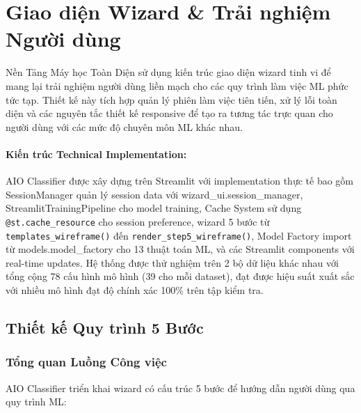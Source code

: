 \section{Giao diện Wizard \& Trải nghiệm Người dùng}\label{sec:wizard-interface}

\noindent
Nền Tảng Máy học Toàn Diện sử dụng kiến trúc giao diện wizard tinh vi để mang lại trải nghiệm người dùng liền mạch cho các quy trình làm việc ML phức tức tạp. Thiết kế này tích hợp quản lý phiên làm việc tiên tiến, xử lý lỗi toàn diện và các nguyên tắc thiết kế responsive để tạo ra tương tác trực quan cho người dùng với các mức độ chuyên môn ML khác nhau.

\paragraph{Kiến trúc Technical Implementation:}
AIO Classifier được xây dựng trên Streamlit với implementation thực tế bao gồm SessionManager quản lý session data với wizard\_ui.session\_manager, StreamlitTrainingPipeline cho model training, Cache System sử dụng \texttt{@st.cache\_resource} cho session preference, wizard 5 bước từ \texttt{templates\_wireframe()} đến \texttt{render\_step5\_wireframe()}, Model Factory import từ models.model\_factory cho 13 thuật toán ML, và các Streamlit components với real-time updates. Hệ thống được thử nghiệm trên 2 bộ dữ liệu khác nhau với tổng cộng 78 cấu hình mô hình (39 cho mỗi dataset), đạt được hiệu suất xuất sắc với nhiều mô hình đạt độ chính xác 100\% trên tập kiểm tra.

\subsection{Thiết kế Quy trình 5 Bước}\label{subsec:wizard-overview}

\subsubsection{Tổng quan Luồng Công việc}

AIO Classifier triển khai wizard có cấu trúc 5 bước để hướng dẫn người dùng qua quy trình ML:

